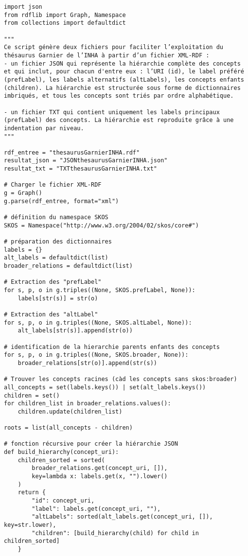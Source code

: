 \begin{verbatim}
import json
from rdflib import Graph, Namespace
from collections import defaultdict

"""
Ce script génère deux fichiers pour faciliter l’exploitation du thésaurus Garnier de l’INHA à partir d’un fichier XML-RDF :
- un fichier JSON qui représente la hiérarchie complète des concepts et qui inclut, pour chacun d'entre eux : l’URI (id), le label préféré (prefLabel), les labels alternatifs (altLabels), les concepts enfants (children). La hiérarchie est structurée sous forme de dictionnaires imbriqués, et tous les concepts sont triés par ordre alphabétique.

- un fichier TXT qui contient uniquement les labels principaux (prefLabel) des concepts. La hiérarchie est reproduite grâce à une indentation par niveau.
"""

rdf_entree = "thesaurusGarnierINHA.rdf"
resultat_json = "JSONthesaurusGarnierINHA.json"
resultat_txt = "TXTthesaurusGarnierINHA.txt"

# Charger le fichier XML-RDF
g = Graph()
g.parse(rdf_entree, format="xml")

# définition du namespace SKOS
SKOS = Namespace("http://www.w3.org/2004/02/skos/core#")

# préparation des dictionnaires
labels = {}
alt_labels = defaultdict(list)
broader_relations = defaultdict(list)

# Extraction des "prefLabel"
for s, p, o in g.triples((None, SKOS.prefLabel, None)):
    labels[str(s)] = str(o)

# Extraction des "altLabel"
for s, p, o in g.triples((None, SKOS.altLabel, None)):
    alt_labels[str(s)].append(str(o))

# identification de la hierarchie parents enfants des concepts
for s, p, o in g.triples((None, SKOS.broader, None)):
    broader_relations[str(o)].append(str(s))

# Trouver les concepts racines (càd les concepts sans skos:broader)
all_concepts = set(labels.keys()) | set(alt_labels.keys())
children = set()
for children_list in broader_relations.values():
    children.update(children_list)

roots = list(all_concepts - children)

# fonction récursive pour créer la hiérarchie JSON
def build_hierarchy(concept_uri):
    children_sorted = sorted(
        broader_relations.get(concept_uri, []),
        key=lambda x: labels.get(x, "").lower()
    )
    return {
        "id": concept_uri,
        "label": labels.get(concept_uri, ""),
        "altLabels": sorted(alt_labels.get(concept_uri, []), key=str.lower),
        "children": [build_hierarchy(child) for child in children_sorted]
    }


\end{verbatim}
